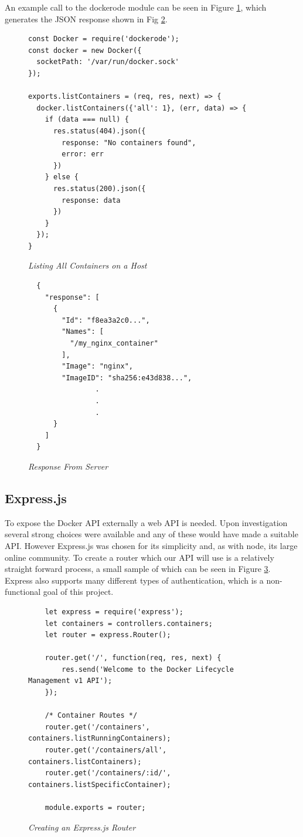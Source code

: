 An example call to the dockerode module can be seen in Figure \ref{fig:dockerode}, which generates the JSON response shown in Fig \ref{fig:response}.

\begin{figure}[!ht]
\begin{lstlisting}
const Docker = require('dockerode');
const docker = new Docker({
  socketPath: '/var/run/docker.sock'
});

exports.listContainers = (req, res, next) => {
  docker.listContainers({'all': 1}, (err, data) => {
    if (data === null) {
      res.status(404).json({
        response: "No containers found",
        error: err
      })
    } else {
      res.status(200).json({
        response: data
      })
    }
  });
}
\end{lstlisting}
\caption{\em Listing All Containers on a Host}
\label{fig:dockerode}
\end{figure}

\begin{figure}[!ht]
\begin{lstlisting}
  {
    "response": [
      {
        "Id": "f8ea3a2c0...",
        "Names": [
          "/my_nginx_container"
        ],
        "Image": "nginx",
        "ImageID": "sha256:e43d838...",
                .
                .
                .
      }
    ]
  }
\end{lstlisting}
\caption{\em Response From Server}
\label{fig:response}
\end{figure}

\newpage
\subsection{Express.js}
\label{sub:express}

To expose the Docker \gls{API} externally a web API is needed. Upon investigation several strong choices were available and any of these would have made a suitable API. However Express.js was chosen for its simplicity and, as with node, its large online community. To create a router which our API will use is a relatively straight forward process, a small sample of which can be seen in Figure \ref{fig:router}. Express also supports many different types of authentication, which is a non-functional goal of this project. 

\begin{figure}[!ht]
\begin{lstlisting}
	let express	= require('express');
	let containers = controllers.containers;
	let router = express.Router();

	router.get('/', function(req, res, next) {
	    res.send('Welcome to the Docker Lifecycle Management v1 API');
	});

	/* Container Routes */
	router.get('/containers', containers.listRunningContainers);
	router.get('/containers/all', containers.listContainers);
	router.get('/containers/:id/', containers.listSpecificContainer);

	module.exports = router;
\end{lstlisting}
\caption{\em Creating an Express.js Router}
\label{fig:router}
\end{figure}

